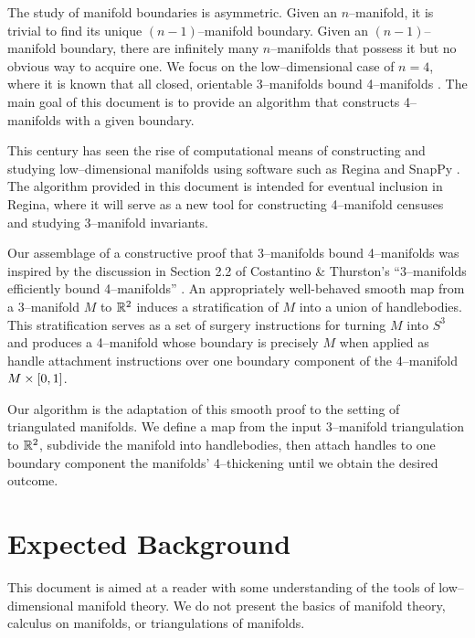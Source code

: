 \label{chapter:introduction}

The study of manifold boundaries is asymmetric.
Given an $n$--manifold, it is trivial to find its unique $(n-1)$--manifold boundary.
Given an $(n-1)$--manifold boundary, there are infinitely many $n$--manifolds that possess it but no obvious way to acquire one.
We focus on the low--dimensional case of $n=4$, where it is known that all closed, orientable 3--manifolds bound 4--manifolds \cite{wbr61, Rokhlin65, Rourke85, Thom}.
The main goal of this document is to provide an algorithm that constructs 4--manifolds with a given boundary.

This century has seen the rise of computational means of constructing and studying low--dimensional manifolds using software such as Regina \cite{regina} and SnapPy \cite{culler2017snappy}.
The algorithm provided in this document is intended for eventual inclusion in Regina, where it will serve as a new tool for constructing 4--manifold censuses and studying 3--manifold invariants.

Our assemblage of a constructive proof that 3--manifolds bound 4--manifolds was inspired by the discussion in Section 2.2 of Costantino \& Thurston's ``3--manifolds efficiently bound 4--manifolds'' \cite{CostThur08}.
An appropriately well-behaved smooth map from a 3--manifold $M$ to $\mathbb{R}^2$ induces a stratification of $M$ into a union of handlebodies.
This stratification serves as a set of surgery instructions for turning $M$ into $S^3$ and produces a 4--manifold whose boundary is precisely $M$ when applied as handle attachment instructions over one boundary component of the 4--manifold $M\times[0,1]$.

Our algorithm is the adaptation of this smooth proof to the setting of triangulated manifolds.
We define a map from the input 3--manifold triangulation to $\mathbb{R}^2$, subdivide the manifold into handlebodies, then attach handles to one boundary component the manifolds' 4--thickening until we obtain the desired outcome.

\section{Expected Background}

This document is aimed at a reader with some understanding of the tools of low--dimensional manifold theory.
We do not present the basics of manifold theory, calculus on manifolds, or triangulations of manifolds.

